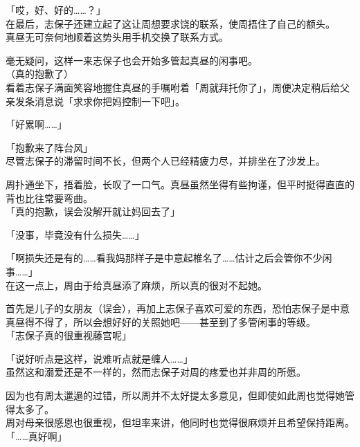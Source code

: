 「哎，好、好的……？」\\

在最后，志保子还建立起了这让周想要求饶的联系，使周捂住了自己的额头。\\

真昼无可奈何地顺着这势头用手机交换了联系方式。

毫无疑问，这样一来志保子也会开始多管起真昼的闲事吧。\\

（真的抱歉了）\\

看着志保子满面笑容地握住真昼的手嘱咐着「周就拜托你了」，周便决定稍后给父亲发条消息说「求求你把妈控制一下吧」。\\

\vspace{2\baselineskip}

「好累啊……」

「抱歉来了阵台风」\\

尽管志保子的滞留时间不长，但两个人已经精疲力尽，并排坐在了沙发上。

周扑通坐下，捂着脸，长叹了一口气。真昼虽然坐得有些拘谨，但平时挺得直直的背也比往常要弯曲。\\%

「真的抱歉，误会没解开就让妈回去了」

「没事，毕竟没有什么损失……」

「啊损失还是有的……看我妈那样子是中意起椎名了……估计之后会管你不少闲事……」\\

在这一点上，周由于给真昼添了麻烦，所以真的很对不起她。

首先是儿子的女朋友（误会），再加上志保子喜欢可爱的东西，恐怕志保子是中意真昼得不得了，所以会想好好的关照她吧——甚至到了多管闲事的等级。\\

「志保子真的很重视藤宫呢」

「说好听点是这样，说难听点就是缠人……」\\

虽然这和溺爱还是不一样的，然而志保子对周的疼爱也并非周的所愿。

因为也有周太邋遢的过错，所以周并不太好提太多意见，但即使如此周也觉得她管得太多了。\\

周对母亲很感恩也很重视，但坦率来讲，他同时也觉得很麻烦并且希望保持距离。\\

「……真好啊」\\

